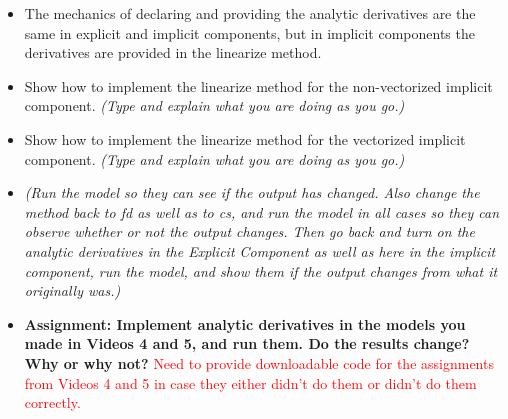 \documentclass[12pt, letterpaper]{article}
\begin{document}
\begin{itemize}
\begin{itemize}
			\item The mechanics of declaring and providing the analytic derivatives are the same in explicit and implicit components, but in implicit components the derivatives are provided in the linearize method.
			\item Show how to implement the linearize method for the non-vectorized implicit component. \textit{(Type and explain what you are doing as you go.)}
			\item Show how to implement the linearize method for the vectorized implicit component. \textit{(Type and explain what you are doing as you go.)}
			\item \textit{(Run the model so they can see if the output has changed. Also change the method back to fd as well as to cs, and run the model in all cases so they can observe whether or not the output changes. Then go back and turn on the analytic derivatives in the Explicit Component as well as here in the implicit component, run the model, and show them if the output changes from what it originally was.)}
			\item \textbf{Assignment: Implement analytic derivatives in the models you made in Videos 4 and 5, and run them. Do the results change? Why or why not?} \textcolor{red}{Need to provide downloadable code for the assignments from Videos 4 and 5 in case they either didn't do them or didn't do them correctly.}
		\end{itemize}


\end{itemize}
\end{document}

